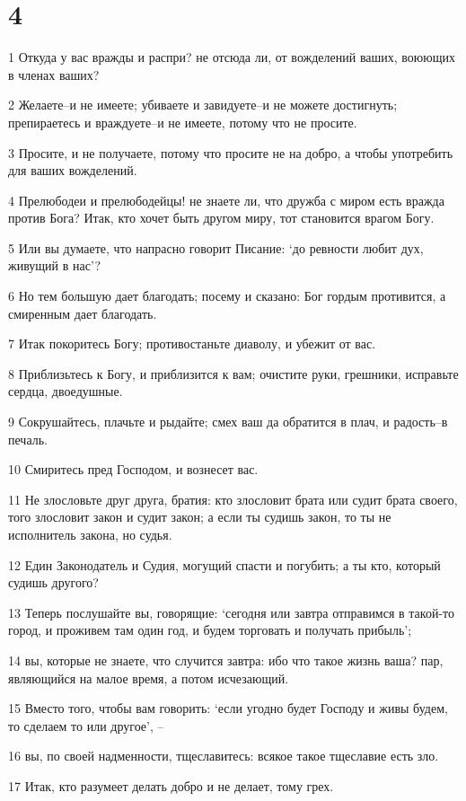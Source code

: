 \chapter{4}

\par 1 Откуда у вас вражды и распри? не отсюда ли, от вожделений ваших, воюющих в членах ваших?
\par 2 Желаете--и не имеете; убиваете и завидуете--и не можете достигнуть; препираетесь и враждуете--и не имеете, потому что не просите.
\par 3 Просите, и не получаете, потому что просите не на добро, а чтобы употребить для ваших вожделений.
\par 4 Прелюбодеи и прелюбодейцы! не знаете ли, что дружба с миром есть вражда против Бога? Итак, кто хочет быть другом миру, тот становится врагом Богу.
\par 5 Или вы думаете, что напрасно говорит Писание: `до ревности любит дух, живущий в нас'?
\par 6 Но тем большую дает благодать; посему и сказано: Бог гордым противится, а смиренным дает благодать.
\par 7 Итак покоритесь Богу; противостаньте диаволу, и убежит от вас.
\par 8 Приблизьтесь к Богу, и приблизится к вам; очистите руки, грешники, исправьте сердца, двоедушные.
\par 9 Сокрушайтесь, плачьте и рыдайте; смех ваш да обратится в плач, и радость--в печаль.
\par 10 Смиритесь пред Господом, и вознесет вас.
\par 11 Не злословьте друг друга, братия: кто злословит брата или судит брата своего, того злословит закон и судит закон; а если ты судишь закон, то ты не исполнитель закона, но судья.
\par 12 Един Законодатель и Судия, могущий спасти и погубить; а ты кто, который судишь другого?
\par 13 Теперь послушайте вы, говорящие: `сегодня или завтра отправимся в такой-то город, и проживем там один год, и будем торговать и получать прибыль';
\par 14 вы, которые не знаете, что случится завтра: ибо что такое жизнь ваша? пар, являющийся на малое время, а потом исчезающий.
\par 15 Вместо того, чтобы вам говорить: `если угодно будет Господу и живы будем, то сделаем то или другое', --
\par 16 вы, по своей надменности, тщеславитесь: всякое такое тщеславие есть зло.
\par 17 Итак, кто разумеет делать добро и не делает, тому грех.

